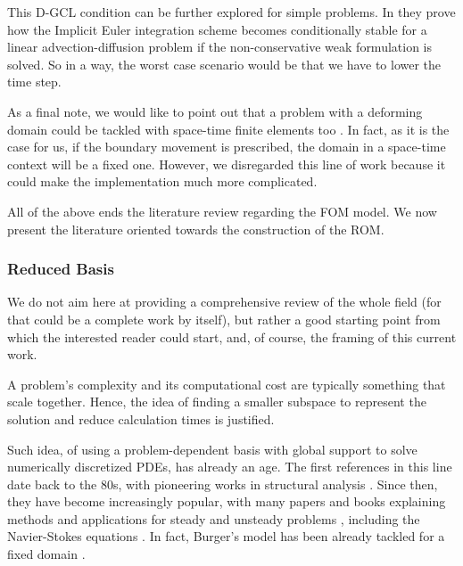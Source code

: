 \documentclass[thesis.tex]{subfiles}
\begin{document}
This D-GCL condition can be further explored for simple problems.
In \cite{formaggiaALE} they prove how the Implicit Euler integration scheme
becomes conditionally stable for a linear advection-diffusion problem
if the non-conservative weak formulation is solved.
So in a way, the worst case scenario would be that we have to lower the time step.

As a final note, 
we would like to point out that a problem with a deforming domain
could be tackled with \mbox{space-time} finite elements too \cite{TEZDUYAR1992339}.
In fact, as it is the case for us, 
if the boundary movement is prescribed,
the domain in a \mbox{space-time} context will be a fixed one.
However, 
we disregarded this line of work because it could make the implementation much more complicated.

All of the above ends the literature review regarding the FOM model.
We now present the literature oriented towards the construction of the ROM.

\subsubsection{Reduced Basis}
We do not aim here at providing a comprehensive review of the whole field
(for that could be a complete work by itself),
but rather a good starting point from which the interested reader could start,
and, of course, the framing of this current work.

A problem's complexity and its computational cost
are typically something that scale together.
Hence, the idea of finding a smaller subspace to represent
the solution and reduce calculation times is justified.

Such idea, of using a problem-dependent basis with global support 
to solve numerically discretized PDEs,
has already an age.
The first references in this line date back to the 80s, 
with pioneering works in structural analysis \cite{1978firstRBStructuralAnalysis}.
Since then, they have become increasingly popular,
with many papers and books explaining methods and applications for steady and unsteady problems
\cite{Rozza2008, 
2005_aPosterioriErrorBoundsReducedBasisApproximationsParametrizedParabolicPde_Grepl,
2009_reducedBasisMethodsAPosterioriErrorEstimatorsHeatTransferProblems_Rozza,
2016_CertifiedReducedBasisMethodsParametrizedPDE_Hesthaven,
Quarteroni2016,
2017_modelReductionAndApproximation,
benner2017_book},
including the Navier-Stokes equations 
\cite{navierStokesReducedBasis}.
In fact, Burger's model has been already tackled for a fixed domain
\cite{Nguyen2009}.
\end{document}
